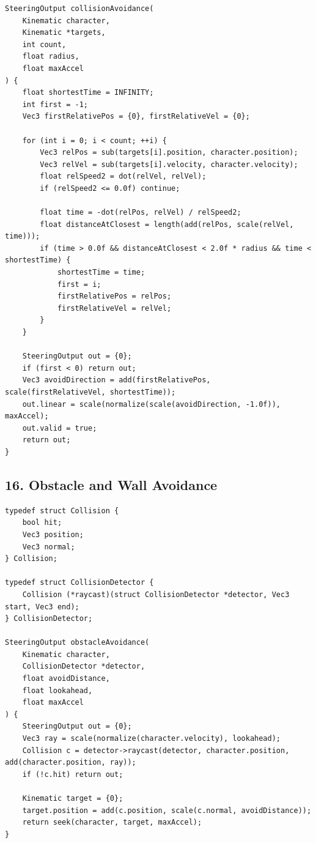 \documentclass[10pt,letterpaper]{article}
\begin{document}
\begin{verbatim}
SteeringOutput collisionAvoidance(
    Kinematic character,
    Kinematic *targets,
    int count,
    float radius,
    float maxAccel
) {
    float shortestTime = INFINITY;
    int first = -1;
    Vec3 firstRelativePos = {0}, firstRelativeVel = {0};

    for (int i = 0; i < count; ++i) {
        Vec3 relPos = sub(targets[i].position, character.position);
        Vec3 relVel = sub(targets[i].velocity, character.velocity);
        float relSpeed2 = dot(relVel, relVel);
        if (relSpeed2 <= 0.0f) continue;

        float time = -dot(relPos, relVel) / relSpeed2;
        float distanceAtClosest = length(add(relPos, scale(relVel, time)));
        if (time > 0.0f && distanceAtClosest < 2.0f * radius && time < shortestTime) {
            shortestTime = time;
            first = i;
            firstRelativePos = relPos;
            firstRelativeVel = relVel;
        }
    }

    SteeringOutput out = {0};
    if (first < 0) return out;
    Vec3 avoidDirection = add(firstRelativePos, scale(firstRelativeVel, shortestTime));
    out.linear = scale(normalize(scale(avoidDirection, -1.0f)), maxAccel);
    out.valid = true;
    return out;
}
\end{verbatim}

\subsection*{16. Obstacle and Wall Avoidance}
{}

\begin{verbatim}
typedef struct Collision {
    bool hit;
    Vec3 position;
    Vec3 normal;
} Collision;

typedef struct CollisionDetector {
    Collision (*raycast)(struct CollisionDetector *detector, Vec3 start, Vec3 end);
} CollisionDetector;

SteeringOutput obstacleAvoidance(
    Kinematic character,
    CollisionDetector *detector,
    float avoidDistance,
    float lookahead,
    float maxAccel
) {
    SteeringOutput out = {0};
    Vec3 ray = scale(normalize(character.velocity), lookahead);
    Collision c = detector->raycast(detector, character.position, add(character.position, ray));
    if (!c.hit) return out;

    Kinematic target = {0};
    target.position = add(c.position, scale(c.normal, avoidDistance));
    return seek(character, target, maxAccel);
}
\end{verbatim}
\end{document}
